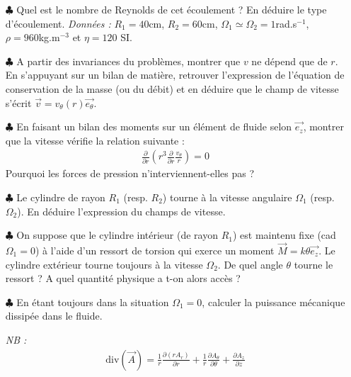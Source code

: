 \documentclass{report}
\begin{document}
\begin{itemize}
	\item[$\clubsuit$] Quel est le nombre de Reynolds de cet écoulement ? En déduire le type d'écoulement. \textit{Données :} $R_1=40$cm, $R_2=60$cm, $\Omega_1\simeq\Omega_2=1$rad.s$^{-1}$, $\rho=960$kg.m$^{-3}$ et $\eta=120$ SI. 

	\item[$\clubsuit$] A partir des invariances du problèmes, montrer que $v$ ne dépend que de $r$. En s'appuyant sur un bilan de matière, retrouver l'expression de l'équation de conservation de la masse (ou du débit) et en déduire que le champ de vitesse s'écrit $\vec{v}=v_\theta (r)\vec{e_\theta}$.
	
	\item[$\clubsuit$ ] En faisant un bilan des moments sur un élément de fluide selon $\vec{e_z}$, montrer que la vitesse vérifie la relation suivante : 
	\begin{align*}
		\frac{\partial}{\partial r}\left(r^3 \frac{\partial}{\partial r}\frac{v_\theta}{r} \right) =0
	\end{align*}
Pourquoi les forces de pression n'interviennent-elles pas ?	
	
	\item[$\clubsuit$] Le cylindre de rayon $R_1$ (resp. $R_2$) tourne à la vitesse angulaire $\Omega_1$ (resp. $\Omega_2$). En déduire l'expression du champs de vitesse. 
	
	\item[$\clubsuit$ ] On suppose que le cylindre intérieur (de rayon $R_1$) est maintenu fixe (cad $\Omega_1=0$) à l'aide d'un ressort de torsion qui exerce un moment $\vec{M}=k\theta\vec{e_z}$. Le cylindre extérieur tourne toujours à la vitesse $\Omega_2$. De quel angle $\theta$ tourne le ressort ? A quel quantité physique a t-on alors accès ?
	
	\item[$\clubsuit$ ] En étant toujours dans la situation $\Omega_1=0$, calculer la puissance mécanique dissipée dans le fluide.
	
\textit{NB :} 
\begin{align*}
	\mathrm{div}(\vec{A}) =
\frac{1}{r}\frac{\partial (r A_r)}{\partial r} + \frac{1}{r}\frac{\partial A_\theta}{\partial \theta} + \frac{\partial A_z}{\partial z}
\end{align*}	
	
\end{itemize}

\newpage
\end{document}
